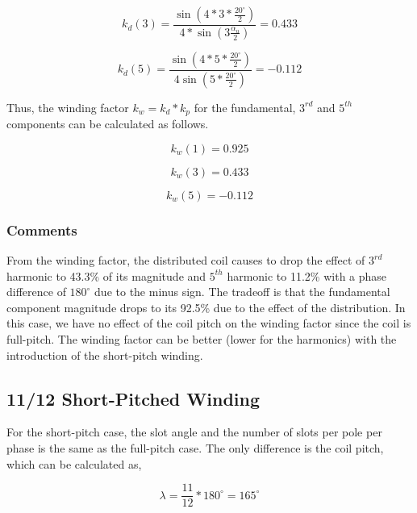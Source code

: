 \documentclass[11pt]{report}
\begin{document}
\begin{equation}
k_{d}(3)=\frac{\sin{(4*3*\frac{20^\circ}{2})}}{4*\sin{(3\frac{\alpha_u}{2})}} = 0.433
\end{equation}

\begin{equation}
k_{d}(5)=\frac{\sin{(4*5*\frac{20^\circ}{2})}}{4\sin{(5*\frac{20^\circ}{2})}} = -0.112
\end{equation}

Thus, the winding factor $k_w = k_d*k_p$ for the fundamental, $3^{rd}$ and $5^{th}$ components can be calculated as follows.

\begin{equation}
    k_w(1) = 0.925
\end{equation}

\begin{equation}
    k_w(3) = 0.433 
\end{equation}

\begin{equation}
    k_w(5) = -0.112 
\end{equation}




\subsubsection*{Comments}

From the winding factor, the distributed coil causes to drop the effect of $3^{rd}$ harmonic to 43.3\% of its magnitude and $5^{th}$ harmonic to 11.2\% with a phase difference of $180^\circ$ due to the minus sign. The tradeoff is that the fundamental component magnitude drops to its 92.5\% due to the effect of the distribution. In this case, we have no effect of the coil pitch on the winding factor since the coil is full-pitch. The winding factor can be better (lower for the harmonics) with the introduction of the short-pitch winding. 


\subsection*{11/12 Short-Pitched Winding}

For the short-pitch case, the slot angle and the number of slots per pole per phase is the same as the full-pitch case. The only difference is the coil pitch, which can be calculated as,

\begin{equation}
    \lambda=\frac{11}{12}*180^\circ=165^\circ
\end{equation}
\end{document}
